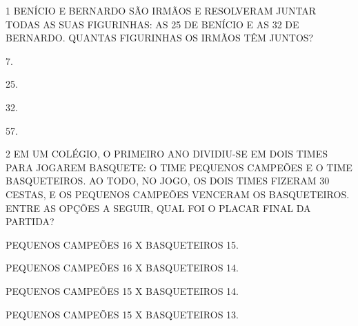 













\num{1} BENÍCIO E BERNARDO SÃO IRMÃOS E RESOLVERAM JUNTAR TODAS AS
SUAS FIGURINHAS: AS 25 DE BENÍCIO E AS 32 DE BERNARDO. QUANTAS FIGURINHAS OS
IRMÃOS TÊM JUNTOS?

\begin{escolha}
\item
  7.
\item
  25.
\item
  32.
\item
  57.
\end{escolha}

\num{2} EM UM COLÉGIO, O PRIMEIRO ANO DIVIDIU-SE EM DOIS TIMES PARA JOGAREM BASQUETE: O TIME PEQUENOS CAMPEÕES E O TIME BASQUETEIROS. AO TODO, NO JOGO, OS DOIS TIMES FIZERAM 30 CESTAS, E OS PEQUENOS CAMPEÕES VENCERAM OS BASQUETEIROS. ENTRE AS OPÇÕES A SEGUIR, QUAL FOI O PLACAR FINAL DA PARTIDA?

\begin{escolha}
\item
  PEQUENOS CAMPEÕES 16 X BASQUETEIROS 15.
\item
  PEQUENOS CAMPEÕES 16 X BASQUETEIROS 14.
\item
  PEQUENOS CAMPEÕES 15 X BASQUETEIROS 14.
\item
  PEQUENOS CAMPEÕES 15 X BASQUETEIROS 13.
\end{escolha}

